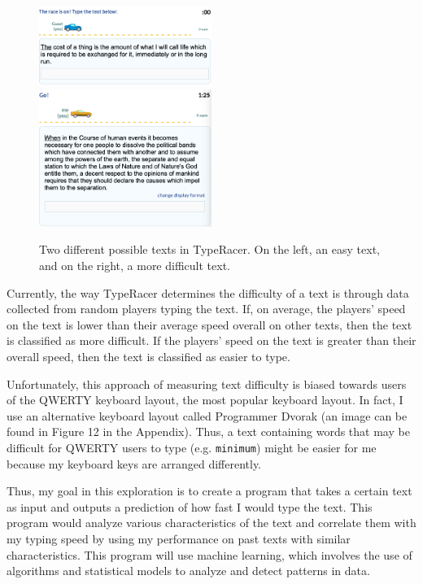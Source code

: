 \documentclass[12pt]{article}
\begin{document}
\begin{figure}[H]
	\caption{Two different possible texts in TypeRacer. On the left, an easy text, and on the right, a more difficult text.}
	\includegraphics[width=0.5\textwidth]{easy-text.png}
	\includegraphics[width=0.5\textwidth]{hard-text.png}
\end{figure}

Currently, the way TypeRacer determines the difficulty of a text is through data collected from random players typing the text. If, on average, the players' speed on the text is lower than their average speed overall on other texts, then the text is classified as more difficult. If the players' speed on the text is greater than their overall speed, then the text is classified as easier to type.

Unfortunately, this approach of measuring text difficulty is biased towards users of the QWERTY keyboard layout, the most popular keyboard layout. In fact, I use an alternative keyboard layout called Programmer Dvorak (an image can be found in Figure 12 in the Appendix). Thus, a text containing words that may be difficult for QWERTY users to type (e.g. \texttt{minimum}) might be easier for me because my keyboard keys are arranged differently.

Thus, my goal in this exploration is to create a program that takes a certain text as input and outputs a prediction of how fast I would type the text. This program would analyze various characteristics of the text and correlate them with my typing speed by using my performance on past texts with similar characteristics. This program will use machine learning, which involves the use of algorithms and statistical models to analyze and detect patterns in data.
\end{document}
